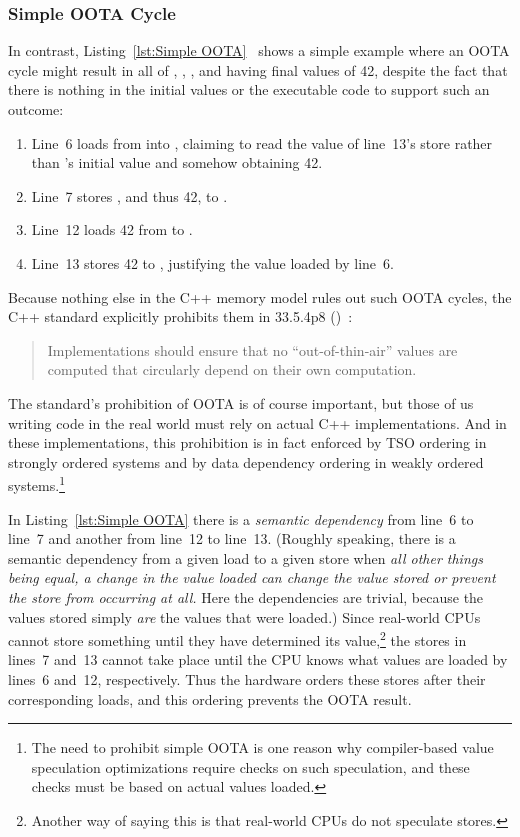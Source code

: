 \documentclass[10]{article}
\begin{document}
\subsubsection{Simple OOTA Cycle}
\label{sec:Simple OOTA Cycle}

In contrast,
Listing~\ref{lst:Simple OOTA}~\cite{PaulEMcKenney2020RelaxedGuideRelaxed}
shows a simple example where an OOTA cycle might result in all of ,
, , and  having final values of 42, despite the fact
that there is nothing in the initial values or the executable code to
support such an outcome:

\begin{enumerate}
\item   Line~6 loads from  into , claiming to read
	the value of line~13's store rather than 's initial value
	and somehow obtaining 42.
\item   Line~7 stores , and thus 42, to .
\item   Line~12 loads 42 from  to .
\item   Line~13 stores 42 to , justifying the value loaded by line~6.
\end{enumerate}

Because nothing else in the C++ memory model rules out such OOTA cycles,
the C++ standard explicitly prohibits them in 33.5.4p8
()~\cite{ThomasKoeppe2023N4950}:

\begin{quote}
	Implementations should ensure that no “out-of-thin-air” values
	are computed that circularly depend on their own computation.
\end{quote}

\noindent
The standard's prohibition of OOTA is of course important, but those of us
writing code in the real world must rely on actual C++ implementations.
And in these implementations, this prohibition is in fact enforced by TSO
ordering in strongly ordered systems and by data dependency ordering in
weakly ordered systems.\footnote{
	The need to prohibit simple OOTA is one reason why compiler-based
	value speculation optimizations require checks on such
	speculation, and these checks must be based on actual values
	loaded.}

In Listing~\ref{lst:Simple OOTA}
there is a \emph{semantic dependency} from line~6 to line~7 and
another from line~12 to line~13.
(Roughly speaking, there is a semantic dependency from a given load
to a given store when \emph{all other things being equal, a change in the
value loaded can change the value stored or prevent the store from
occurring at all.}
Here the dependencies are trivial, because the values stored simply
\emph{are} the values that were loaded.)
Since real-world CPUs cannot store something
until they have determined its value,\footnote{
	Another way of saying this is that real-world CPUs do not
	speculate stores.}
the stores in lines~7 and~13 cannot take place until the CPU
knows what values are loaded by lines~6 and~12, respectively.
Thus the hardware orders these stores after their corresponding loads,
and this ordering prevents the OOTA result.
\end{document}
